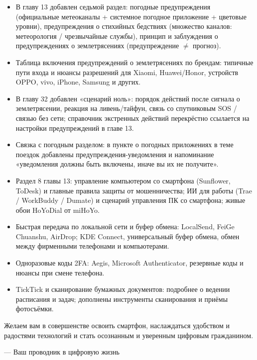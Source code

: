 \begin{itemize}
  \item В главу 13 добавлен седьмой раздел: погодные предупреждения (официальные метеоканалы + системное погодное приложение + цветовые уровни), предупреждения о стихийных бедствиях (множество каналов: метеорология / чрезвычайные службы), принцип и заблуждения о предупреждениях о землетрясениях (предупреждение $\neq$ прогноз).
  \item Таблица включения предупреждений о землетрясениях по брендам: типичные пути входа и нюансы разрешений для Xiaomi, Huawei/Honor, устройств OPPO, vivo, iPhone, Samsung и других.
  \item В главу 32 добавлен «сценарий ноль»: порядок действий после сигнала о землетрясении, реакция на ливень/тайфун, связь со спутниковым SOS / связью без сети; справочник экстренных действий перекрёстно ссылается на настройки предупреждений в главе 13.
  \item Связка с погодным разделом: в пункте о погодных приложениях в теме поездок добавлены предупреждения-уведомления и напоминание «уведомления должны быть включены, иначе вы их не получите».
\end{itemize}


\begin{itemize}
  \item Раздел 8 главы 13: управление компьютером со смартфона (Sunflower, ToDesk) и главные правила защиты от мошенничества; ИИ для работы (Trae / WorkBuddy / Dumate) и сценарий управления ПК со смартфона; живые обои HoYoDial от miHoYo.
  \item Быстрая передача по локальной сети и буфер обмена: LocalSend, FeiGe Chuanshu, AirDrop; KDE Connect, универсальный буфер обмена, обмен между фирменными телефонами и компьютерами.
  \item Одноразовые коды 2FA: Aegis, Microsoft Authenticator, резервные коды и нюансы при смене телефона.
  \item TickTick и сканирование бумажных документов: подробнее о ведении расписания и задач; дополнены инструменты сканирования и приёмы фотосъёмки.
\end{itemize}

Желаем вам в совершенстве освоить смартфон, наслаждаться удобством и радостями технологий и стать осознанным и уверенным цифровым гражданином.

— Ваш проводник в цифровую жизнь
